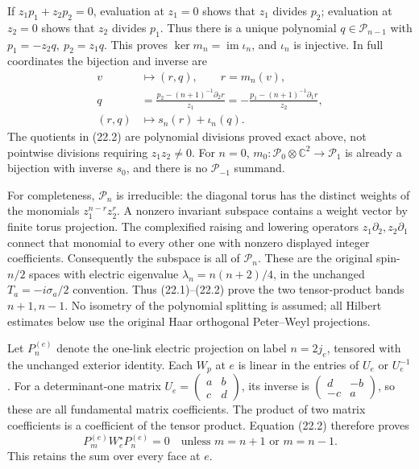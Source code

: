 \documentclass[
]{article}
\begin{document}
If \(z_1p_1+z_2p_2=0\), evaluation at \(z_1=0\) shows that \(z_1\)
divides \(p_2\); evaluation at \(z_2=0\) shows that \(z_2\) divides
\(p_1\). Thus there is a unique polynomial \(q\in\mathcal P_{n-1}\) with
\(p_1=-z_2q,\ p_2=z_1q\). This proves
\(\ker m_n=\operatorname{im}\iota_n\), and \(\iota_n\) is injective. In
full coordinates the bijection and inverse are \[
\begin{aligned}
v&\longmapsto(r,q),\qquad r=m_n(v),\\
q&=\frac{p_2-(n+1)^{-1}\partial_2r}{z_1}
  =-\frac{p_1-(n+1)^{-1}\partial_1r}{z_2},\\
(r,q)&\longmapsto s_n(r)+\iota_n(q).
\end{aligned}                                                   \tag{22.2}
\] The quotients in (22.2) are polynomial divisions proved exact above,
not pointwise divisions requiring \(z_1z_2\ne0\). For \(n=0\),
\(m_0:\mathcal P_0\otimes\mathbb C^2\to\mathcal P_1\) is already a
bijection with inverse \(s_0\), and there is no \(\mathcal P_{-1}\)
summand.

For completeness, \(\mathcal P_n\) is irreducible: the diagonal torus
has the distinct weights of the monomials \(z_1^{n-r}z_2^r\). A nonzero
invariant subspace contains a weight vector by finite torus projection.
The complexified raising and lowering operators
\(z_1\partial_2,z_2\partial_1\) connect that monomial to every other one
with nonzero displayed integer coefficients. Consequently the subspace
is all of \(\mathcal P_n\). These are the original spin-\(n/2\) spaces
with electric eigenvalue \(\lambda_n=n(n+2)/4\), in the unchanged
\(T_a=-i\sigma_a/2\) convention. Thus (22.1)--(22.2) prove the two
tensor-product bands \(n+1,n-1\). No isometry of the polynomial
splitting is assumed; all Hilbert estimates below use the original Haar
orthogonal Peter--Weyl projections.

Let \(P_n^{(e)}\) denote the one-link electric projection on label
\(n=2j_e\), tensored with the unchanged exterior identity. Each \(W_p\)
at \(e\) is linear in the entries of \(U_e\) or \(U_e^{-1}\). For a
determinant-one matrix
\(U_e=\left(\begin{smallmatrix}a&b\\c&d\end{smallmatrix}\right)\), its
inverse is
\(\left(\begin{smallmatrix}d&-b\\-c&a\end{smallmatrix}\right)\), so
these are all fundamental matrix coefficients. The product of two matrix
coefficients is a coefficient of the tensor product. Equation (22.2)
therefore proves \[
P_m^{(e)}W_e^\star P_n^{(e)}=0
       \quad\text{unless }m=n+1\text{ or }m=n-1 .
                                                               \tag{22.3}
\] This retains the sum over every face at \(e\).
\end{document}
